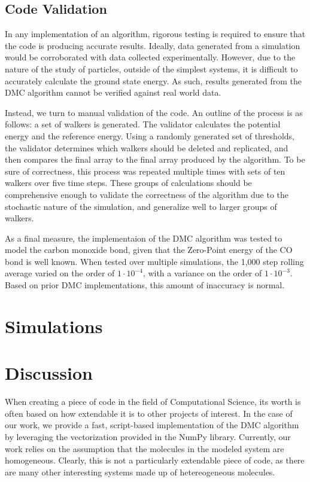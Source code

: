 \documentclass[journal=jacsat,manuscript=article]{achemso}
\begin{document}
\subsection{Code Validation}

In any implementation of an algorithm, rigorous testing is required to ensure that the code is producing accurate results. Ideally, data generated from a simulation would be corroborated with data collected experimentally. However, due to the nature of the study of particles, outside of the simplest systems, it is difficult to accurately calculate the ground state energy. As such, results generated from the DMC algorithm cannot be verified against real world data. 

Instead, we turn to manual validation of the code. An outline of the process is as follows: a set of walkers is generated. The validator calculates the potential energy and the reference energy. Using a randomly generated set of thresholds, the validator determines which walkers should be deleted and replicated, and then compares the final array to the final array produced by the algorithm. To be sure of correctness, this process was repeated multiple times with sets of ten walkers over five time steps. These groups of calculations should be comprehensive enough to validate the correctness of the algorithm due to the stochastic nature of the simulation, and generalize well to larger groups of walkers. 

As a final measure, the implementaion of the DMC algorithm was tested to model the carbon monoxide bond, given that the Zero-Point energy of the CO bond is well known. When tested over multiple simulations, the 1,000 step rolling average varied on the order of  $1\cdot10^{-4}$, with a variance on the order of $1\cdot10^{-3}$. Based on prior DMC implementations, this amount of inaccuracy is normal.  

\section{Simulations}

\section{Discussion}
When creating a piece of code in the field of Computational Science, its worth is often based on how extendable it is to other projects of interest. In the case of our work, we provide a fast, script-based implementation of the DMC algorithm by leveraging the vectorization provided in the NumPy library. Currently, our work relies on the assumption that the molecules in the modeled system are homogeneous. Clearly, this is not a particularly extendable piece of code, as there are many other interesting systems made up of hetereogeneous molecules. 
\end{document}
